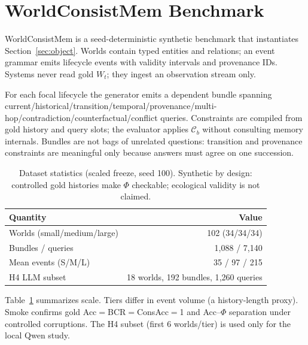 \section{WorldConsistMem Benchmark}
\label{sec:benchmark}

WorldConsistMem is a seed-deterministic synthetic benchmark that instantiates Section~\ref{sec:object}. Worlds contain typed entities and relations; an event grammar emits lifecycle events with validity intervals and provenance IDs. Systems never read gold $W_t$; they ingest an observation stream only.

For each focal lifecycle the generator emits a dependent bundle spanning current/historical/transition/temporal/provenance/multi-hop/contradiction/counterfactual/conflict queries. Constraints are compiled from gold history and query slots; the evaluator applies $\mathcal{C}_b$ without consulting memory internals. Bundles are not bags of unrelated questions: transition and provenance constraints are meaningful only because answers must agree on one succession.

\begin{table}[t]
\centering
\caption{Dataset statistics (scaled freeze, seed 100). Synthetic by design: controlled gold histories make $\Phi$ checkable; ecological validity is not claimed.}
\label{tab:dataset}
\small
\begin{tabular}{lr}
\toprule
Quantity & Value \\
\midrule
Worlds (small/medium/large) & 102 (34/34/34) \\
Bundles / queries & 1{,}088 / 7{,}140 \\
Mean events (S/M/L) & 35 / 97 / 215 \\
H4 LLM subset & 18 worlds, 192 bundles, 1{,}260 queries \\
\bottomrule
\end{tabular}
\end{table}

Table~\ref{tab:dataset} summarizes scale. Tiers differ in event volume (a history-length proxy). Smoke confirms gold Acc$=$BCR$=$ConsAcc$=$1 and Acc--$\Phi$ separation under controlled corruptions. The H4 subset (first 6 worlds/tier) is used only for the local Qwen study.

